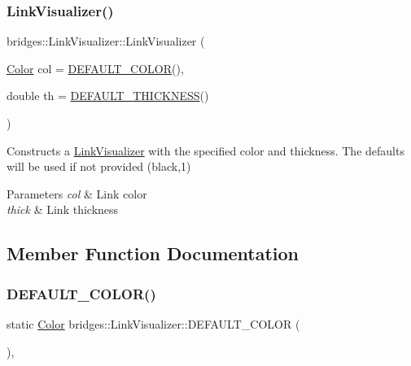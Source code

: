 \subsubsection{\texorpdfstring{Link\+Visualizer()}{LinkVisualizer()}}
{\footnotesize\ttfamily bridges\+::\+Link\+Visualizer\+::\+Link\+Visualizer (\begin{DoxyParamCaption}\item[{\mbox{\hyperlink{classbridges_1_1_color}{Color}}}]{col = {\ttfamily \mbox{\hyperlink{classbridges_1_1_link_visualizer_a5e121c52fc270337c58413d0fd72cf58}{D\+E\+F\+A\+U\+L\+T\+\_\+\+C\+O\+L\+OR}}()},  }\item[{double}]{th = {\ttfamily \mbox{\hyperlink{classbridges_1_1_link_visualizer_a6d05e052d64964d876f557901635079d}{D\+E\+F\+A\+U\+L\+T\+\_\+\+T\+H\+I\+C\+K\+N\+E\+SS}}()} }\end{DoxyParamCaption})\hspace{0.3cm}{\ttfamily [inline]}}

Constructs a \mbox{\hyperlink{classbridges_1_1_link_visualizer}{Link\+Visualizer}} with the specified color and thickness. The defaults will be used if not provided (black,1)


\begin{DoxyParams}{Parameters}
{\em col} & Link color \\
\hline
{\em thick} & Link thickness \\
\hline
\end{DoxyParams}


\subsection{Member Function Documentation}
\mbox{\label{classbridges_1_1_link_visualizer_a5e121c52fc270337c58413d0fd72cf58}} 
\subsubsection{\texorpdfstring{D\+E\+F\+A\+U\+L\+T\+\_\+\+C\+O\+L\+O\+R()}{DEFAULT\_COLOR()}}
{\footnotesize\ttfamily static \mbox{\hyperlink{classbridges_1_1_color}{Color}} bridges\+::\+Link\+Visualizer\+::\+D\+E\+F\+A\+U\+L\+T\+\_\+\+C\+O\+L\+OR (\begin{DoxyParamCaption}{ }\end{DoxyParamCaption})\hspace{0.3cm}{\ttfamily [inline]}, {\ttfamily [static]}}

